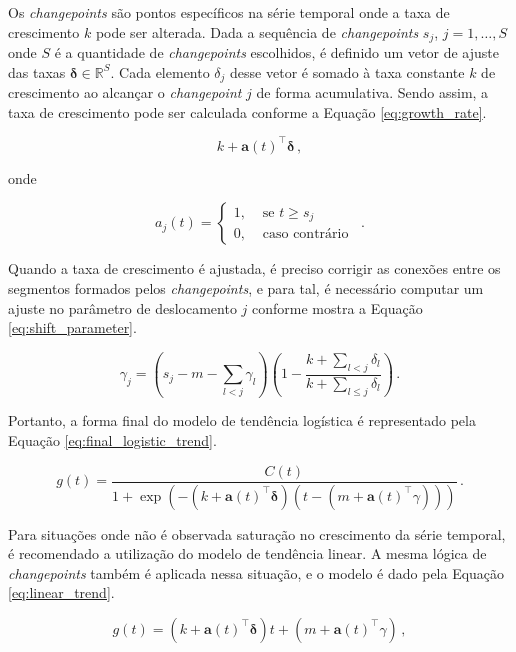 Os \textit{changepoints} são pontos específicos na série temporal onde a taxa de crescimento $k$ pode ser alterada. Dada a sequência de \textit{changepoints} $s_{j}$, $j=1, \ldots, S$ onde $S$ é a quantidade de \textit{changepoints} escolhidos, é definido um vetor de ajuste das taxas $\boldsymbol{\delta} \in \mathbb{R}^{S}$. Cada elemento $\delta_{j}$ desse vetor é somado à taxa constante $k$ de crescimento ao alcançar o \textit{changepoint} $j$ de forma acumulativa. Sendo assim, a taxa de crescimento pode ser calculada conforme a Equação \eqref{eq:growth_rate}.

\begin{equation}\label{eq:growth_rate}
    k+\mathbf{a}(t)^{\top} \boldsymbol{\delta}\, ,
\end{equation}

onde

\[
    a_{j}(t)= \begin{cases}1, & \text { se } t \geq s_{j} \\ 0, & \text { caso contrário }\end{cases}\, .
\]

Quando a taxa de crescimento é ajustada, é preciso corrigir as conexões entre os segmentos formados pelos \textit{changepoints}, e para tal, é necessário computar um ajuste no parâmetro de deslocamento $j$ conforme mostra a Equação \eqref{eq:shift_parameter}.

\begin{equation}\label{eq:shift_parameter}
    \gamma_{j}=\left(s_{j}-m-\sum_{l<j} \gamma_{l}\right)\left(1-\frac{k+\sum_{l<j} \delta_{l}}{k+\sum_{l \leq j} \delta_{l}}\right)\, .
\end{equation}

Portanto, a forma final do modelo de tendência logística é representado pela Equação \eqref{eq:final_logistic_trend}.

\begin{equation}\label{eq:final_logistic_trend}
    g(t)=\frac{C(t)}{1+\exp \left(-\left(k+\mathbf{a}(t)^{\top} \boldsymbol{\delta}\right)\left(t-\left(m+\mathbf{a}(t)^{\top} \gamma\right)\right)\right)}\, .
\end{equation}

Para situações onde não é observada saturação no crescimento da série temporal, é recomendado a utilização do modelo de tendência linear. A mesma lógica de \textit{changepoints} também é aplicada nessa situação, e o modelo é dado pela Equação \eqref{eq:linear_trend}.

\begin{equation}\label{eq:linear_trend}
    g(t)=\left(k+\mathbf{a}(t)^{\top} \boldsymbol{\delta}\right) t+\left(m+\mathbf{a}(t)^{\top} \gamma\right)\, ,
\end{equation}

